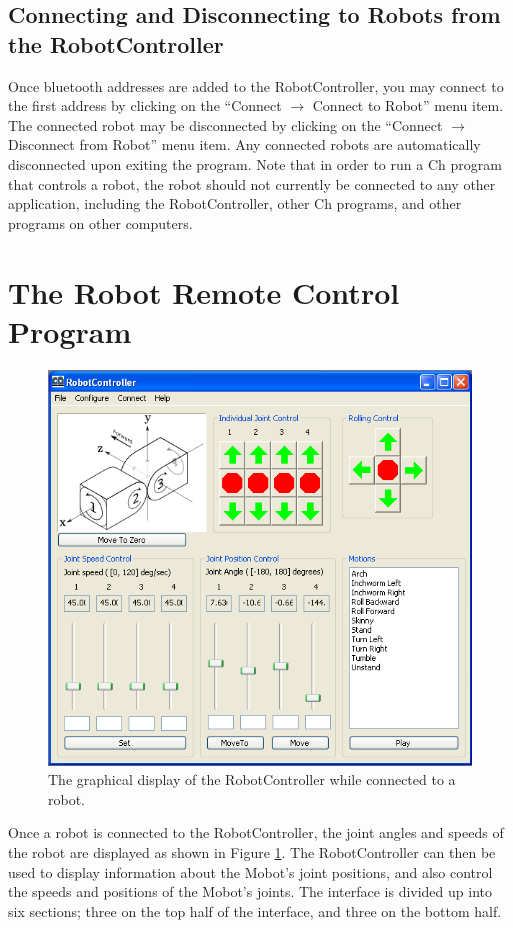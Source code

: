 \documentclass{article}
\begin{document}
\subsection{Connecting and Disconnecting to Robots from the RobotController}
Once bluetooth addresses are added to the RobotController, you may connect to the 
first address by clicking on the ``Connect $\rightarrow$ Connect to Robot''
menu item. The connected robot may be disconnected by clicking on the 
``Connect $\rightarrow$ Disconnect from Robot'' menu item. Any connected robots are
automatically disconnected upon exiting the program. Note that in order to run a Ch
program that controls a robot, the robot should not currently be connected to any
other application, including the RobotController, other Ch programs, and other
programs on other computers.

\section{ The Robot Remote Control Program }
\begin{figure}[H]
\begin{center}
\includegraphics[width=4.5in]{images/shot1_populated.png}
\end{center}
\caption{\label{fig:shot1_populated.png} The graphical display of the RobotController
while connected to a robot.}
\end{figure}

Once a robot is connected to the RobotController, the joint angles and speeds
of the robot are displayed as shown in Figure \ref{fig:shot1_populated.png}.
The RobotController can then be
used to display
information about the Mobot's joint positions, and also control the
speeds and positions of the Mobot's joints. The interface is divided
up into six sections; three on the top half of the interface, and three on 
the bottom half. 
\end{document}
